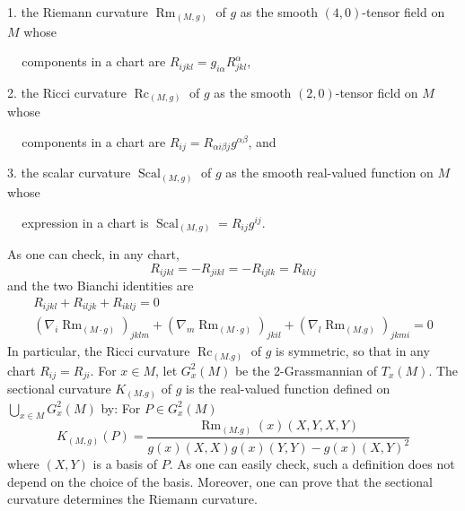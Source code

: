 \documentclass[12pt,hyperref,a4paper,UTF8]{ctexart}
\begin{document}
1. the Riemann curvature $\operatorname{Rm}_{(M, g)}$ of $g$ as the smooth $(4,0)$-tensor field on $M$ whose 

$\quad\,$components in a chart are $R_{i j k l}=g_{i \alpha} R_{j k l}^\alpha$,

2. the Ricci curvature $\operatorname{R c}_{(M, g)}$ of $g$ as the smooth $(2,0)$-tensor ficld on $M$ whose 

$\quad\,$components in a chart are $R_{i j}=R_{\alpha i \beta j} g^{\alpha \beta}$, and

3. the scalar curvature $\operatorname{Scal}_{(M, g)}$ of $g$ as the smooth real-valued function on $M$ whose 

$\quad\,$expression in a chart is $\operatorname{Scal}_{(M, g)}=R_{i j} g^{i j}$.

\noindent
As one can check, in any chart,
$$
R_{i j k l}=-R_{j i k l}=-R_{i j l k}=R_{k l i j}
$$
and the two Bianchi identities are
$$
\begin{array}{l}
R_{i j k l}+R_{i l j k}+R_{i k l j}=0 \\
\left(\nabla_i \operatorname{Rm}_{(M \cdot g)}\right)_{j k l m}+\left(\nabla_m \operatorname{Rm}_{(M \cdot g)}\right)_{j k i l}+\left(\nabla_l \operatorname{Rm}_{(M . g)}\right)_{j k m i}=0
\end{array}
$$
In particular, the Ricci curvature $\operatorname{Rc}_{(M . g)}$ of $g$ is symmetric, so that in any chart $R_{i j}=R_{j i}$. For $x \in M$, let $G_x^2(M)$ be the 2-Grassmannian of $T_x(M)$. The sectional curvature $K_{(M . g)}$ of $g$ is the real-valued function defined on $\bigcup_{x \in M} G_x^2(M)$ by: For $P \in G_x^2(M)$
$$
K_{(M, g)}(P)=\frac{\operatorname{Rm}_{(M . g)}(x)(X, Y, X, Y)}{g(x)(X, X) g(x)(Y, Y)-g(x)(X, Y)^2}
$$
where $(X, Y)$ is a basis of $P$. As one can easily check, such a definition does not depend on the choice of the basis. Moreover, one can prove that the sectional curvature determines the Riemann curvature.
\end{document}
